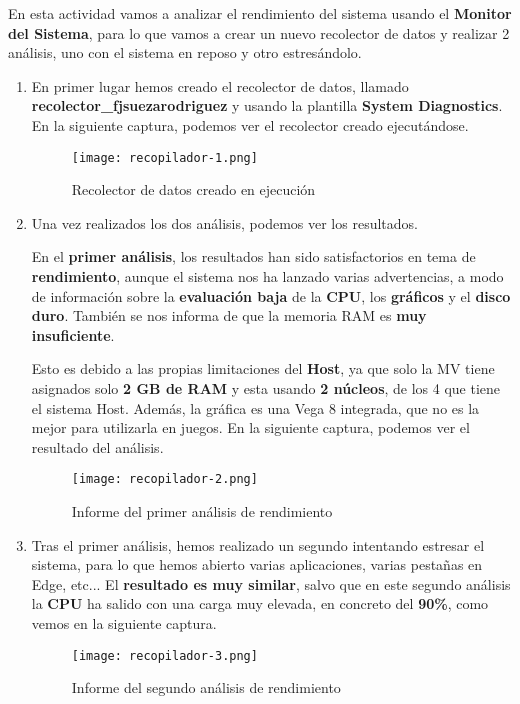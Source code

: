 En esta actividad vamos a analizar el rendimiento del sistema usando el \textbf{Monitor del Sistema}, para lo que vamos a crear un nuevo recolector de datos y realizar 2 análisis, uno con el sistema en reposo y otro estresándolo.

\begin{enumerate}
    \item En primer lugar hemos creado el recolector de datos, llamado \textbf{recolector\_fjsuezarodriguez} y usando la plantilla \textbf{System Diagnostics}. En la siguiente captura, podemos ver el recolector creado ejecutándose.

    \begin{figure}[H]
        \centering
        \texttt{[image: recopilador-1.png]}
        \caption{Recolector de datos creado en ejecución}
    \end{figure}

    \item Una vez realizados los dos análisis, podemos ver los resultados.

    En el \textbf{primer análisis}, los resultados han sido satisfactorios en tema de \textbf{rendimiento}, aunque el sistema nos ha lanzado varias advertencias, a modo de información sobre la \textbf{evaluación baja} de la \textbf{CPU}, los \textbf{gráficos} y el \textbf{disco duro}. También se nos informa de que la memoria RAM es \textbf{muy insuficiente}.

    Esto es debido a las propias limitaciones del \textbf{Host}, ya que solo la MV tiene asignados solo \textbf{2 GB de RAM} y esta usando \textbf{2 núcleos}, de los 4 que tiene el sistema Host. Además, la gráfica es una Vega 8 integrada, que no es la mejor para utilizarla en juegos. En la siguiente captura, podemos ver el resultado del análisis.

    \begin{figure}[H]
        \centering
        \texttt{[image: recopilador-2.png]}
        \caption{Informe del primer análisis de rendimiento}
    \end{figure}

    \item Tras el primer análisis, hemos realizado un segundo intentando estresar el sistema, para lo que hemos abierto varias aplicaciones, varias pestañas en Edge, etc... El \textbf{resultado es muy similar}, salvo que en este segundo análisis la \textbf{CPU} ha salido con una carga muy elevada, en concreto del \textbf{90\%}, como vemos en la siguiente captura.

    \begin{figure}[H]
        \centering
        \texttt{[image: recopilador-3.png]}
        \caption{Informe del segundo análisis de rendimiento}
    \end{figure}
\end{enumerate}


